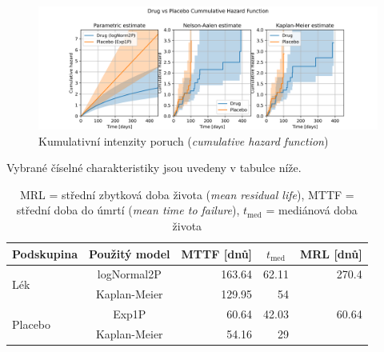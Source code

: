 \documentclass[a4, 11pt]{article}
\theoremstyle{definition}
\theoremstyle{remark}
\begin{document}
   	\begin{figure}[H]
        \centering
        \includegraphics[width=1.0\linewidth]{img/cumulative_hazard_function_drug_vs_placebo_TRIPLE.png}
        \caption{Kumulativní intenzity poruch (\textit{cumulative hazard function})}
        \label{fig:CHF_for_parametric}
    \end{figure}     
    
    
    Vybrané číselné charakteristiky jsou uvedeny v tabulce níže.
 
\begin{table}[H]
    \centering
    \begin{tabular}{@{}lcrrr@{}}
        \toprule
        \multicolumn{1}{c}{Podskupina} & Použitý model & \multicolumn{1}{c}{MTTF {[}dnů{]}} & \multicolumn{1}{c}{$t_{\mbox{med}}$} & \multicolumn{1}{c}{MRL {[}dnů{]}} \\ \midrule
        \multirow{2}{*}{Lék}     & logNormal2P  & 163.64 & 62.11 & 270.4 \\
        & Kaplan-Meier & 129.95 & 54    &       \\
        \multirow{2}{*}{Placebo} & Exp1P        & 60.64  & 42.03 & 60.64 \\
        & Kaplan-Meier & 54.16  & 29    &       \\ \bottomrule
    \end{tabular}
    \caption{MRL = střední zbytková doba života (\textit{mean residual life}), MTTF = střední doba do úmrtí (\textit{mean time to failure}), $t_{\mbox{med}}$ = mediánová doba života}
    \label{tab:statistics}
\end{table}
\end{document}
